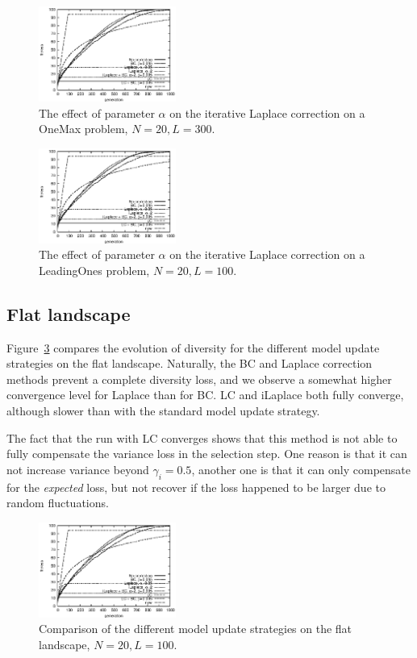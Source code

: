 \documentclass{acm_proc_article-sp}
\newcommand{\Np}{N}
\newcommand{\p}{\gamma}
\begin{document}
\begin{figure}
\centerline{
\includegraphics[width=0.4\textwidth]{graph_leading1169910391/graph_leading000_fitness.eps}}
\caption{The effect of parameter $\alpha$ on the iterative Laplace correction on 
a OneMax problem, $\Np=20, L=300$.\label{fig:ialpha}}
\end{figure}

\begin{figure}[r]
\includegraphics[width=0.4\textwidth]{graph_leading1169910391/graph_leading000_fitness.eps}
\caption{The effect of parameter $\alpha$ on the iterative Laplace correction on 
a LeadingOnes problem, $\Np=20, L=100$.\label{fig:ialpha2}}
\end{figure}


\subsection{Flat landscape}
\label{sec:flat}

Figure~\ref{fig:flat} compares the evolution of diversity for the different model update
strategies on the flat landscape.
Naturally, the BC and Laplace correction methods prevent a complete diversity loss, 
and we observe a somewhat higher convergence level for Laplace than for BC. LC and iLaplace
both fully converge, although slower than with the standard model update strategy.

The fact that the run with LC converges shows that this method is not able to fully
compensate the variance loss in the selection step. One reason is that it can not increase
variance beyond $\p_i=0.5$, another one is that it can only compensate for the {\em expected} loss, but not recover if the loss happened to be larger due to random fluctuations.
\begin{figure}
\includegraphics[width=0.4\textwidth]{graph_leading1169910391/graph_leading000_fitness.eps}
\caption{Comparison of the different model update strategies on the flat landscape, $\Np=20, L=100$.\label{fig:flat}}
\end{figure}
\end{document}
